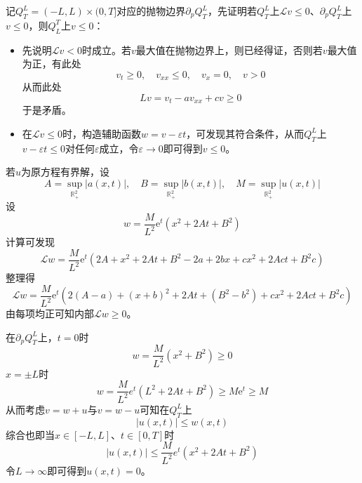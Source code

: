 \documentclass[a4paper,UTF8,fontset=windows,10pt]{ctexart}
\newcommand*{\er}{\mathrm{e}}
\begin{document}
\begin{enumerate}
    记$Q_T^L=(-L,L)\times(0,T]$对应的抛物边界$\partial_pQ_T^L$，先证明若$Q_T^L$上$\mathcal{L}v\le0$、$\partial_pQ_T^L$上$v\le0$，则$Q_L^T$上$v\le0$：
    \begin{itemize}
        \item 先说明$\mathcal{L}v<0$时成立。若$v$最大值在抛物边界上，则已经得证，否则若$v$最大值为正，有此处
        $$v_t\ge0,\quad v_{xx}\le0,\quad v_x=0,\quad v>0$$
        从而此处
        $$Lv=v_t-av_{xx}+cv\ge0$$
        于是矛盾。
        \item 在$\mathcal{L}v\le0$时，构造辅助函数$w=v-\varepsilon t$，可发现其符合条件，从而$Q_T^L$上$v-\varepsilon t\le 0$对任何$\varepsilon$成立，令$\varepsilon\to0$即可得到$v\le0$。
    \end{itemize}
    
    若$u$为原方程有界解，设
    $$A=\sup_{\mathbb{R}_+^2}|a(x,t)|,\quad B=\sup_{\mathbb{R}_+^2}|b(x,t)|,\quad M=\sup_{\mathbb{R}_+^2}|u(x,t)|$$
    设
    $$w=\frac{M}{L^2}\er^t(x^2+2At+B^2)$$
    计算可发现
    $$\mathcal{L}w=\frac{M}{L^2}\er^t(2A+x^2+2At+B^2-2a+2bx+cx^2+2Act+B^2c)$$
    整理得
    $$\mathcal{L}w=\frac{M}{L^2}\er^t(2(A-a)+(x+b)^2+2At+(B^2-b^2)+cx^2+2Act+B^2c)$$
    由每项均正可知内部$\mathcal{L}w\ge0$。
    
    在$\partial_pQ_T^L$上，$t=0$时
    $$w=\frac{M}{L^2}(x^2+B^2)\ge0$$
    $x=\pm L$时
    $$w=\frac{M}{L^2}e^t(L^2+2At+B^2)\ge M\er^t\ge M$$
    从而考虑$v=w+u$与$v=w-u$可知在$Q_T^L$上
    $$|u(x,t)|\le w(x,t)$$
    综合也即当$x\in[-L,L]$、$t\in[0,T]$时
    $$|u(x,t)|\le \frac{M}{L^2}e^t(x^2+2At+B^2)$$
    令$L\to\infty$即可得到$u(x,t)=0$。
\end{enumerate}
\end{document}
